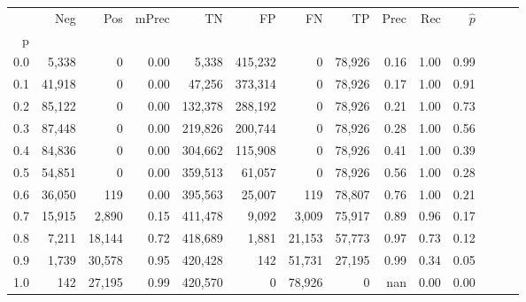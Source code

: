 \begin{tabular}{rrrrrrrrrrrrrr}
\toprule
{} &     Neg &     Pos & mPrec &       TN &       FP &      FN &      TP &  Prec &   Rec & $\hat{p}$ \\
p   &         &         &       &          &          &         &         &       &       &           \\
\midrule
0.0 &   5,338 &       0 &  0.00 &    5,338 &  415,232 &       0 &  78,926 &  0.16 &  1.00 &      0.99 \\
0.1 &  41,918 &       0 &  0.00 &   47,256 &  373,314 &       0 &  78,926 &  0.17 &  1.00 &      0.91 \\
0.2 &  85,122 &       0 &  0.00 &  132,378 &  288,192 &       0 &  78,926 &  0.21 &  1.00 &      0.73 \\
0.3 &  87,448 &       0 &  0.00 &  219,826 &  200,744 &       0 &  78,926 &  0.28 &  1.00 &      0.56 \\
0.4 &  84,836 &       0 &  0.00 &  304,662 &  115,908 &       0 &  78,926 &  0.41 &  1.00 &      0.39 \\
0.5 &  54,851 &       0 &  0.00 &  359,513 &   61,057 &       0 &  78,926 &  0.56 &  1.00 &      0.28 \\
0.6 &  36,050 &     119 &  0.00 &  395,563 &   25,007 &     119 &  78,807 &  0.76 &  1.00 &      0.21 \\
0.7 &  15,915 &   2,890 &  0.15 &  411,478 &    9,092 &   3,009 &  75,917 &  0.89 &  0.96 &      0.17 \\
0.8 &   7,211 &  18,144 &  0.72 &  418,689 &    1,881 &  21,153 &  57,773 &  0.97 &  0.73 &      0.12 \\
0.9 &   1,739 &  30,578 &  0.95 &  420,428 &      142 &  51,731 &  27,195 &  0.99 &  0.34 &      0.05 \\
1.0 &     142 &  27,195 &  0.99 &  420,570 &        0 &  78,926 &       0 &   nan &  0.00 &      0.00 \\
\bottomrule
\end{tabular}
